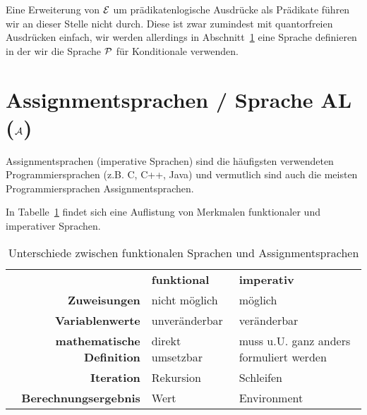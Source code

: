 {\begin{comment}
\textit{Lösung:}
\begin{align*}
&\quad \I{P}{\omega}{\text{istLeer?}(x)\twedge ist1?(x)} \\
&\Lra \I{P}{\omega}{\text{istLeer?}(x)}\wedge\I{P}{\omega}{ist1?(x)} \\
&\Lra \text{istLeer?}(\I{T}{\omega}{x})\wedge\text{ist1?}(\I{T}{\omega}{x}) \\
&\Lra \text{istLeer?}(\omega(\u{x}))\wedge\text{ist1?}(\omega(\u{x})) \\
\intertext{$\text{istLeer?}(\omega(\u{x}))=T$ genau dann wenn $\omega(\u{x})=\varepsilon$, dann ist aber $\text{ist1?}(\omega(\u{x}))=F$. Die Und-Verknüfpung kann also nicht zu $T$ evaluieren.}
&\Lra F
\end{align*}
Der Ausdruck ist \textbf{nicht erfüllbar}.
\end{\whichenum}
\end{bsp}
\ifthenelse{\boolean{long}}{}{\end{comment}}

Eine Erweiterung von $\mathcal{E}$ um prädikatenlogische Ausdrücke als Prädikate
führen wir an dieser Stelle nicht durch. Diese ist zwar zumindest mit quantorfreien
Ausdrücken einfach, wir werden allerdings in Abschnitt~\ref{sec:AL} eine Sprache
definieren in der wir die Sprache $\mathcal{P}$ für Konditionale verwenden.

\section{Assignmentsprachen / Sprache AL ($\mathcal{A}$)}\label{sec:AL}
Assignmentsprachen (imperative Sprachen) sind die häufigsten verwendeten Programmiersprachen (z.B. C, C++, Java)
und vermutlich sind auch die meisten Programmiersprachen Assignmentsprachen.

In Tabelle~\ref{unterschiede_funktional_imperativ} findet sich eine Auflistung von Merkmalen funktionaler und imperativer Sprachen.
\begin{table}[h!t]
 \centering

\begin{tabular}{rp{0.25\hsize}p{0.25\hsize}}
 & \textbf{funktional} & \textbf{imperativ} \\
\textbf{Zuweisungen} & nicht möglich & möglich \\
\textbf{Variablenwerte} & unveränderbar & veränderbar \\
\textbf{mathematische Definition} & direkt umsetzbar & muss u.U. ganz anders formuliert werden \\
\textbf{Iteration} & Rekursion & Schleifen \\
\textbf{Berechnungsergebnis} & Wert & Environment
\end{tabular}

\caption{Unterschiede zwischen funktionalen Sprachen und Assignmentsprachen}
 \label{unterschiede_funktional_imperativ}
\end{table}

